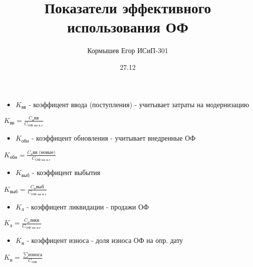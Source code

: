 \documentclass[11pt]{article}
\author{Кормышев Егор ИСиП-301}
\date{27.12}
\title{Показатели эффективного использования ОФ}
\begin{document}
\maketitle
\tableofcontents

\begin{itemize}
\item \(K_\text{вв}\) - коэффицент ввода (поступления) - учитывает затраты на модернизацию \\[0pt]
\end{itemize}

\begin{math}
K_\text{вв} = \frac{C_{\text{п}}\text{вв}}{C_{\text{ОФ на к.г}}}
\end{math}

\begin{itemize}
\item \(K_\text{обн}\) - коэффицент обновления - учитывает  внедренные ОФ \\[0pt]
\end{itemize}


\begin{math}
K_\text{обн} = \frac{C_{\text{п}}\text{вв (новые)}}{C_{\text{ОФ на к.г}}}
\end{math}

\begin{itemize}
\item \(K_\text{выб}\) - коэффицент выбытия
\end{itemize}


\begin{math}
K_\text{выб} = \frac{C_{\text{п}}\text{выб}}{C_{\text{ОФ на н.г}}}
\end{math}


\begin{itemize}
\item \(K_\text{л}\) - коэффицент ликвидации - продажи ОФ
\end{itemize}


\begin{math}
K_\text{л} = \frac{C_{\text{п}}\text{ликв}}{C_{\text{ОФ на н.г}}}
\end{math}


\begin{itemize}
\item \(K_\text{и}\) - коэффицент износа - доля износа ОФ на опр. дату
\end{itemize}


\begin{math}
K_\text{и} = \frac{\sum \text{износа}}{C_{\text{ОФ}}}
\end{math}
\end{document}
